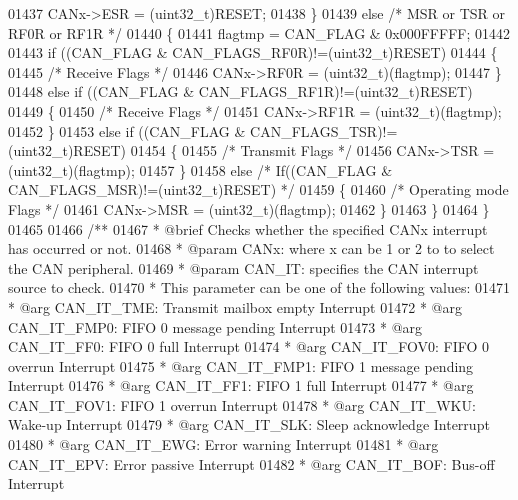 \begin{DoxyCode}
01437     CANx->ESR = (uint32\_t)RESET;
01438   \}
01439   \textcolor{keywordflow}{else} \textcolor{comment}{/* MSR or TSR or RF0R or RF1R */}
01440   \{
01441     flagtmp = CAN\_FLAG & 0x000FFFFF;
01442 
01443     \textcolor{keywordflow}{if} ((CAN\_FLAG & CAN_FLAGS_RF0R)!=(uint32\_t)RESET)
01444     \{
01445       \textcolor{comment}{/* Receive Flags */}
01446       CANx->RF0R = (uint32\_t)(flagtmp);
01447     \}
01448     \textcolor{keywordflow}{else} \textcolor{keywordflow}{if} ((CAN\_FLAG & CAN_FLAGS_RF1R)!=(uint32\_t)RESET)
01449     \{
01450       \textcolor{comment}{/* Receive Flags */}
01451       CANx->RF1R = (uint32\_t)(flagtmp);
01452     \}
01453     \textcolor{keywordflow}{else} \textcolor{keywordflow}{if} ((CAN\_FLAG & CAN_FLAGS_TSR)!=(uint32\_t)RESET)
01454     \{
01455       \textcolor{comment}{/* Transmit Flags */}
01456       CANx->TSR = (uint32\_t)(flagtmp);
01457     \}
01458     \textcolor{keywordflow}{else} \textcolor{comment}{/* If((CAN\_FLAG & CAN\_FLAGS\_MSR)!=(uint32\_t)RESET) */}
01459     \{
01460       \textcolor{comment}{/* Operating mode Flags */}
01461       CANx->MSR = (uint32\_t)(flagtmp);
01462     \}
01463   \}
01464 \}
01465 
01466 \textcolor{comment}{/**}
01467 \textcolor{comment}{  * @brief  Checks whether the specified CANx interrupt has occurred or not.}
01468 \textcolor{comment}{  * @param  CANx: where x can be 1 or 2 to to select the CAN peripheral.}
01469 \textcolor{comment}{  * @param  CAN\_IT: specifies the CAN interrupt source to check.}
01470 \textcolor{comment}{  *          This parameter can be one of the following values:}
01471 \textcolor{comment}{  *            @arg CAN\_IT\_TME: Transmit mailbox empty Interrupt }
01472 \textcolor{comment}{  *            @arg CAN\_IT\_FMP0: FIFO 0 message pending Interrupt }
01473 \textcolor{comment}{  *            @arg CAN\_IT\_FF0: FIFO 0 full Interrupt}
01474 \textcolor{comment}{  *            @arg CAN\_IT\_FOV0: FIFO 0 overrun Interrupt}
01475 \textcolor{comment}{  *            @arg CAN\_IT\_FMP1: FIFO 1 message pending Interrupt }
01476 \textcolor{comment}{  *            @arg CAN\_IT\_FF1: FIFO 1 full Interrupt}
01477 \textcolor{comment}{  *            @arg CAN\_IT\_FOV1: FIFO 1 overrun Interrupt}
01478 \textcolor{comment}{  *            @arg CAN\_IT\_WKU: Wake-up Interrupt}
01479 \textcolor{comment}{  *            @arg CAN\_IT\_SLK: Sleep acknowledge Interrupt  }
01480 \textcolor{comment}{  *            @arg CAN\_IT\_EWG: Error warning Interrupt}
01481 \textcolor{comment}{  *            @arg CAN\_IT\_EPV: Error passive Interrupt}
01482 \textcolor{comment}{  *            @arg CAN\_IT\_BOF: Bus-off Interrupt  }

\end{DoxyCode}
